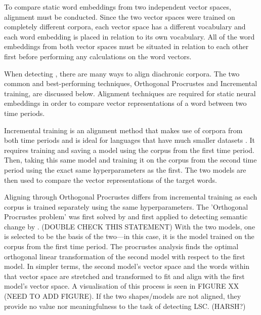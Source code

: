 To compare static word embeddings from two independent vector spaces, alignment must be conducted. Since the two vector spaces were trained on completely different corpora, each vector space has a different vocabulary and each word embedding is placed in relation to its own vocabulary. All of the word embeddings from both vector spaces must be situated in relation to each other first before performing any calculations on the word vectors. 

When detecting , there are many ways to align diachronic corpora. The two common and best-performing techniques, Orthogonal Procrustes and Incremental training, are discussed below. Alignment techniques are required for static neural embeddings in order to compare vector representations of a word between two time periods. 

Incremental training is an alignment method that makes use of corpora from both time periods and is ideal for languages that have much smaller datasets \citep{kim-temporal2014}. It requires training and saving a model using the corpus from the first time period. Then, taking this same model and training it on the corpus from the second time period using the exact same hyperparameters as the first. The two models are then used to compare the vector representations of the target words. 

Aligning through Orthogonal Procrustes differs from incremental training as each corpus is trained separately using the same hyperparameters. The 'Orthogonal Procrustes problem' was first solved by \citet{schonemann1966} and first applied to detecting semantic change by \citet{hamilton-etal-2016-diachronic}. (DOUBLE CHECK THIS STATEMENT) With the two models, one is selected to be the basis of the two—in this case, it is the model trained on the corpus from the first time period. The procrustes analysis finds the optimal orthogonal linear transformation of the second model with respect to the first model. In simpler terms, the second model’s vector space and the words within that vector space are stretched and transformed to fit and align with the first model’s vector space. A visualisation of this process is seen in FIGURE XX (NEED TO ADD FIGURE). If the two shapes/models are not aligned, they provide no value nor meaningfulness to the task of detecting LSC. (HARSH?)

